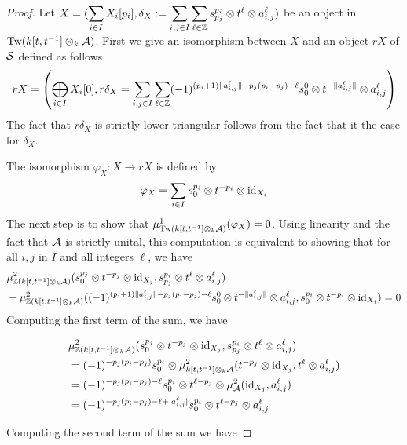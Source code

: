 \documentclass[12pt]{article}
\begin{document}
	\begin{proof}
		Let $X = (\displaystyle\sum_{i \in I} X_i[p_i],\delta_X:= \displaystyle\sum_{i,j \in I} \displaystyle\sum_{\ell \in \mathbb{Z}} s^{p_i}_{p_j} \otimes t^\ell \otimes a^\ell_{i,j})$ be an object in $\textup{Tw}(k[t,t^{-1}] \otimes_k {\cal{A}})$. First we give an isomorphism between $X$ and an object $rX$ of ${\cal{S}}$ defined as follows
		\[rX = \left(\bigoplus_{i \in I} X_i[0], r\delta_X = \sum_{i,j \in I} \sum_{\ell \in \mathbb{Z}} (-1)^{(p_i+1)\|a^\ell_{i,j}\| -p_j(p_i-p_j)-\ell} s^0_0 \otimes t^{- \|a^\ell_{i,j}\|} \otimes a^\ell_{i,j} \right)\] 
		The fact that $r\delta_X$ is strictly lower triangular follows from the fact that it the case for $\delta_X$. 
		
		\noindent The isomorphism $\varphi_X: X \to rX$ is defined by
		\[\varphi_X = \sum_{i \in I} s^{p_i}_0 \otimes t^{-p_i} \otimes \textup{id}_{X_i}\]
		The next step is to show that $\mu^1_{\textup{Tw}(k[t,t^{-1}] \otimes_k {\cal{A}})}(\varphi_X) = 0$. Using linearity and the fact that ${\cal{A}}$ is strictly unital, this computation is equivalent to showing that for all $i,j$ in $I$ and all integers $\ell$, we have 
		\begin{align*}
			&\mu^2_{\mathbb{Z}(k[t,t^{-1}] \otimes_k {\cal{A}})}(s^{p_j}_0 \otimes t^{-p_j} \otimes \textup{id}_{X_j},s^{p_i}_{p_j} \otimes t^\ell \otimes a^\ell_{i,j}) \\
			&+ \mu^2_{\mathbb{Z}(k[t,t^{-1}] \otimes_k {\cal{A}})}( (-1)^{(p_i+1)\|a^\ell_{i,j}\| -p_j(p_i-p_j)-\ell}s^0_0 \otimes t^{- \|a^\ell_{i,j}\|} \otimes a^\ell_{i,j},s^{p_i}_0 \otimes t^{-p_i} \otimes \textup{id}_{X_i}) = 0
		\end{align*}
		Computing the first term of the sum, we have
		
		\begin{align*}
			& \mu^2_{\mathbb{Z}(k[t,t^{-1}] \otimes_k {\cal{A}})}(s^{p_j}_0 \otimes t^{-p_j} \otimes \textup{id}_{X_j},s^{p_i}_{p_j} \otimes t^\ell \otimes a^\ell_{i,j}) \\
			&= (-1)^{-p_j(p_i-p_j)} s^{p_i}_0 \otimes \mu^2_{k[t,t^{-1}] \otimes_k {\cal{A}}}(t^{-p_j} \otimes \textup{id}_{X_j}, t^\ell \otimes a^\ell_{i,j}) \\
			&= (-1)^{-p_j(p_i-p_j)-\ell} s^{p_i}_0 \otimes t^{\ell-p_j} \otimes \mu^2_{\cal{A}}(\textup{id}_{X_j},a^\ell_{i,j}) \\
			&= (-1)^{-p_j(p_i-p_j)-\ell + |a^\ell_{i,j}|} s^{p_i}_0 \otimes t^{\ell-p_j} \otimes a^\ell_{i,j}
		\end{align*}
		
		\noindent Computing the second term of the sum we have
		

\end{proof}
\end{document}
